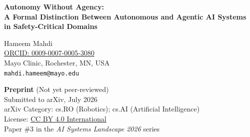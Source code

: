 \documentclass[12pt, a4paper]{article}
\begin{document}
\begin{center}
    {\Large\bfseries Autonomy Without Agency:\\[4pt]
    A Formal Distinction Between Autonomous and Agentic AI Systems\\[2pt]
    in Safety-Critical Domains}

    \vspace{1em}

    {\large Hameem Mahdi}\\[2pt]
    {\small \href{https://orcid.org/0009-0007-0005-3080}{ORCID: 0009-0007-0005-3080}}\\[4pt]
    Mayo Clinic, Rochester, MN, USA\\
    \texttt{mahdi.hameem@mayo.edu}

    \vspace{1em}

    {\small\textbf{Preprint} (Not yet peer-reviewed)}\\[2pt]
    {\small Submitted to arXiv, July 2026}\\[2pt]
    {\small arXiv Category: cs.RO (Robotics); cs.AI (Artificial Intelligence)}\\[2pt]
    {\small License: \href{https://creativecommons.org/licenses/by/4.0/}{CC BY 4.0 International}}\\[2pt]
    {\small Paper \#3 in the \emph{AI Systems Landscape 2026} series}
\end{center}

\vspace{1em}
\end{document}
